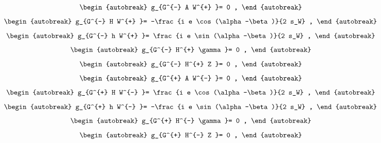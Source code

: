 \begin{align}
\begin{autobreak}
g_{G^{-} A W^{+} }=
	0
	,
\end{autobreak}
\end{align}
\begin{align}
\begin{autobreak}
g_{G^{-} H W^{+} }=
	-\frac{i e \cos (\alpha -\beta )}{2 s_W}
	,
\end{autobreak}
\end{align}
\begin{align}
\begin{autobreak}
g_{G^{-} h W^{+} }=
	\frac{i e \sin (\alpha -\beta )}{2 s_W}
	,
\end{autobreak}
\end{align}
\begin{align}
\begin{autobreak}
g_{G^{-} H^{+} \gamma }=
	0
	,
\end{autobreak}
\end{align}
\begin{align}
\begin{autobreak}
g_{G^{-} H^{+} Z }=
	0
	,
\end{autobreak}
\end{align}
\begin{align}
\begin{autobreak}
g_{G^{+} A W^{-} }=
	0
	,
\end{autobreak}
\end{align}
\begin{align}
\begin{autobreak}
g_{G^{+} H W^{-} }=
	\frac{i e \cos (\alpha -\beta )}{2 s_W}
	,
\end{autobreak}
\end{align}
\begin{align}
\begin{autobreak}
g_{G^{+} h W^{-} }=
	-\frac{i e \sin (\alpha -\beta )}{2 s_W}
	,
\end{autobreak}
\end{align}
\begin{align}
\begin{autobreak}
g_{G^{+} H^{-} \gamma }=
	0
	,
\end{autobreak}
\end{align}
\begin{align}
\begin{autobreak}
g_{G^{+} H^{-} Z }=
	0
	,
\end{autobreak}
\end{align}
